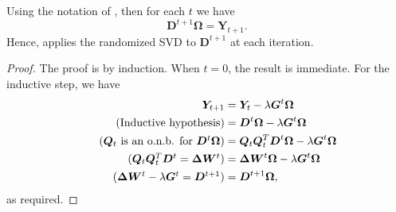 \documentclass[11pt]{article}
\newcommand{\mat}[1]{\bm{#1}}
\newcommand{\DW}{\mat{\Delta W}}
\begin{document}
\begin{lemma}
    Using the notation of , then for each $t$ we have
    \begin{equation*}
        \bm{D}^{t+1}\bm{\Omega} = \bm{Y}_{t+1}.
    \end{equation*}
    Hence,  applies the randomized SVD to $\bm{D}^{t+1}$ at each iteration. 
\end{lemma}
\begin{proof}
    The proof is by induction. When $t = 0$, the result is immediate. For the inductive step, we have
    \begin{align*}
        \bm{Y}_{t+1} & = \bm{Y}_t - \lambda \bm{G}^t \bm{\Omega}\\
        \tag{Inductive hypothesis} &= \bm{D}^t \bm{\Omega} - \lambda \bm{G}^{t}\bm{\Omega}\\
        \tag{$\bm{Q}_t$ is an o.n.b. for $\bm{D}^t \bm{\Omega}$} &= \bm{Q}_t \bm{Q}_t^T \bm{D}^t \bm{\Omega} - \lambda \bm{G}^t \bm{\Omega}\\
        \tag{$\bm{Q}_t \bm{Q}_t^T \bm{D}^t = \DW^t$} & = \DW^t \bm{\Omega} - \lambda \bm{G}^t \bm{\Omega}\\
        \tag{$\DW^t  - \lambda \bm{G}^t =\bm{D}^{t+1}$} &= \bm{D}^{t+1} \bm{\Omega},
    \end{align*}
    as required.
\end{proof}

\end{document}
